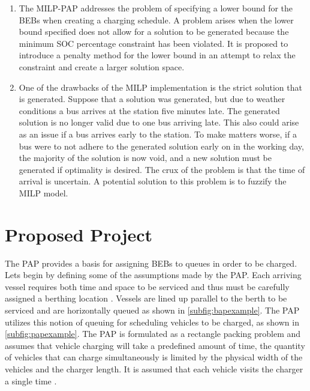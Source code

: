 \documentclass[ee,msthesis]{usuthesis}
\begin{document}
\begin{enumerate}
\item The MILP-PAP addresses the problem of specifying a lower bound for the BEBs when creating a charging schedule. A
problem arises when the lower bound specified does not allow for a solution to be generated because the minimum SOC
percentage constraint has been violated. It is proposed to introduce a penalty method for the lower bound in an
attempt to relax the constraint and create a larger solution space.

\item One of the drawbacks of the MILP implementation is the strict solution that is generated. Suppose that a solution was
generated, but due to weather conditions a bus arrives at the station five minutes late. The generated solution is no
longer valid due to one bus arriving late. This also could arise as an issue if a bus arrives early to the station.
To make matters worse, if a bus were to not adhere to the generated solution early on in the working day, the
majority of the solution is now void, and a new solution must be generated if optimality is desired. The crux of the
problem is that the time of arrival is uncertain. A potential solution to this problem is to fuzzify the MILP model.
\end{enumerate}
\chapter{Proposed Project}
\label{sec:proposed-project}
The PAP provides a basis for assigning BEBs to queues in order to be charged. Lets begin by defining some of the
assumptions made by the PAP. Each arriving vessel requires both time and space to be serviced and thus must be carefully
assigned a berthing location \cite{imai-2001-dynam-berth}. Vessels are lined up parallel to the berth to be serviced
and are horizontally queued as shown in \autoref{subfig:bapexample}. The PAP utilizes this notion of queuing for
scheduling vehicles to be charged, as shown in \autoref{subfig:papexample}. The PAP is formulated as a rectangle packing
problem and assumes that vehicle charging will take a predefined amount of time, the quantity of vehicles that can
charge simultaneously is limited by the physical width of the vehicles and the charger length. It is assumed that each
vehicle visits the charger a single time \cite{qarebagh-2019-optim-sched}.
\end{document}
